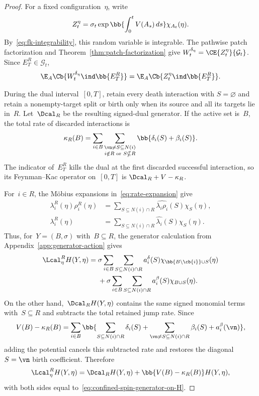 \begin{proof}
For a fixed configuration~$\eta$, write
\begin{equation*}
Z_t^\eta
=
\sigma_t
\exp\bb{\int_0^tV(A_s)\,ds}
\chi_{A_t}(\eta).
\end{equation*}
By~\eqref{eq:fk-integrability}, this random variable is integrable. The
pathwise patch factorization and Theorem~\ref{thm:patch-factorization} give
$W_t^{\delta_\eta}=\CE{Z_t^\eta}{\mathcal G_t}$. Since
$E_T^R\in\mathcal G_t$,
\begin{equation}
\label{eq:confined-weight-to-dual}
\E_A\Cb{W_t^{\delta_\eta}\ind\bb{E_T^R}}
=
\E_A\Cb{Z_t^\eta\ind\bb{E_T^R}}.
\end{equation}

During the dual interval~$[0,T]$, retain every death interaction with
$S=\varnothing$ and retain a nonempty-target split or birth only when its source
and all its targets lie in~$R$. Let~$\Dcal_R$ be the resulting signed-dual
generator. If the active set is~$B$, the total rate of discarded interactions is
\begin{equation*}
\kappa_R(B)
=
\sum_{i\in B}
\sum_{\substack{\vn\neq S\subseteq N(i)\\i\notin R\text{ or }S\nsubseteq R}}
\bb{\delta_i(S)+\beta_i(S)}.
\end{equation*}
The indicator of~$E_T^R$ kills the dual at the first discarded successful
interaction, so its Feynman--Kac operator on~$[0,T]$ is
$\Dcal_R+V-\kappa_R$.

For~$i\in R$, the M\"obius expansions in~\eqref{eq:rate-expansion} give
\begin{align*}
\lambda_i^R(\eta)\rho_i^R(\eta)
&=
\sum_{S\subseteq N(i)\cap R}
\widehat{\lambda_i\rho_i}(S)\chi_S(\eta),
\\
\lambda_i^R(\eta)
&=
\sum_{S\subseteq N(i)\cap R}
\widehat{\lambda_i}(S)\chi_S(\eta).
\end{align*}
Thus, for~$Y=(B,\sigma)$ with~$B\subseteq R$, the generator calculation from
Appendix~\ref{app:generator-action} gives
\begin{align}
\Lcal_\eta^R H(Y,\eta)
={}&
\sigma
\sum_{i\in B}
\sum_{S\subseteq N(i)\cap R}
 a_i^\delta(S)
 \chi_{\bb{B\setminus\cb{i}}\cup S}(\eta)
\notag
\\
&+
\sigma
\sum_{i\in B}
\sum_{S\subseteq N(i)\cap R}
 a_i^\beta(S)
 \chi_{B\cup S}(\eta).
\label{eq:confined-spin-generator-on-H}
\end{align}
On the other hand,~$\Dcal_R H(Y,\eta)$ contains the same signed monomial terms
with~$S\subseteq R$ and subtracts the total retained jump rate. Since
\begin{equation*}
V(B)-\kappa_R(B)
=
\sum_{i\in B}
\bb{
 \sum_{S\subseteq N(i)\cap R}\delta_i(S)
 +
 \sum_{\substack{\vn\neq S\subseteq N(i)\cap R}}\beta_i(S)
 +
 a_i^\beta(\vn)
},
\end{equation*}
adding the potential cancels this subtracted rate and restores the diagonal
$S=\vn$ birth coefficient. Therefore
\begin{equation}
\label{eq:confined-generator-duality}
\Lcal_\eta^R H(Y,\eta)
=
\Dcal_RH(Y,\eta)
+
\bb{V(B)-\kappa_R(B)}H(Y,\eta),
\end{equation}
with both sides equal to~\eqref{eq:confined-spin-generator-on-H}.


\end{proof}
